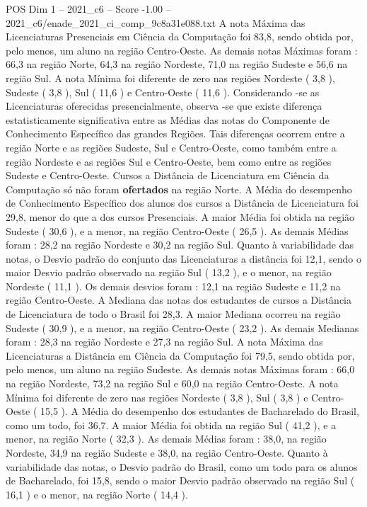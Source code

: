 \begin{textsample}{POS Dim 1 – 2021\_c6 – Score -1.00 – 2021\_c6/enade\_2021\_ci\_comp\_9c8a31e088.txt}
A nota Máxima das Licenciaturas Presenciais em Ciência da Computação foi 83,8, sendo obtida por, pelo menos, um aluno na região Centro-Oeste.
As demais notas Máximas foram : 66,3 na região Norte, 64,3 na região Nordeste, 71,0 na região Sudeste e 56,6 na região Sul.
A nota Mínima foi diferente de zero nas regiões Nordeste ( 3,8 ), Sudeste ( 3,8 ), Sul ( 11,6 ) e Centro-Oeste ( 11,6 ).
Considerando -se as Licenciaturas oferecidas presencialmente, observa -se que existe diferença estatisticamente significativa entre as Médias das notas do Componente de Conhecimento Específico das grandes Regiões.
Tais diferenças ocorrem entre a região Norte e as regiões Sudeste, Sul e Centro-Oeste, como também entre a região Nordeste e as regiões Sul e Centro-Oeste, bem como entre as regiões Sudeste e Centro-Oeste.
Cursos a Distância de Licenciatura em Ciência da Computação só não foram \textbf{ofertados} na região Norte.
A Média do desempenho de Conhecimento Específico dos alunos dos cursos a Distância de Licenciatura foi 29,8, menor do que a dos cursos Presenciais.
A maior Média foi obtida na região Sudeste ( 30,6 ), e a menor, na região Centro-Oeste ( 26,5 ).
As demais Médias foram : 28,2 na região Nordeste e 30,2 na região Sul.
Quanto à variabilidade das notas, o Desvio padrão do conjunto das Licenciaturas a distância foi 12,1, sendo o maior Desvio padrão observado na região Sul ( 13,2 ), e o menor, na região Nordeste ( 11,1 ).
Os demais desvios foram : 12,1 na região Sudeste e 11,2 na região Centro-Oeste.
A Mediana das notas dos estudantes de cursos a Distância de Licenciatura de todo o Brasil foi 28,3.
A maior Mediana ocorreu na região Sudeste ( 30,9 ), e a menor, na região Centro-Oeste ( 23,2 ).
As demais Medianas foram : 28,3 na região Nordeste e 27,3 na região Sul.
A nota Máxima das Licenciaturas a Distância em Ciência da Computação foi 79,5, sendo obtida por, pelo menos, um aluno na região Sudeste.
As demais notas Máximas foram : 66,0 na região Nordeste, 73,2 na região Sul e 60,0 na região Centro-Oeste.
A nota Mínima foi diferente de zero nas regiões Nordeste ( 3,8 ), Sul ( 3,8 ) e Centro-Oeste ( 15,5 ).
A Média do desempenho dos estudantes de Bacharelado do Brasil, como um todo, foi 36,7.
A maior Média foi obtida na região Sul ( 41,2 ), e a menor, na região Norte ( 32,3 ).
As demais Médias foram : 38,0, na região Nordeste, 34,9 na região Sudeste e 38,0, na região Centro-Oeste.
Quanto à variabilidade das notas, o Desvio padrão do Brasil, como um todo para os alunos de Bacharelado, foi 15,8, sendo o maior Desvio padrão observado na região Sul ( 16,1 ) e o menor, na região Norte ( 14,4 ).

\end{textsample}
